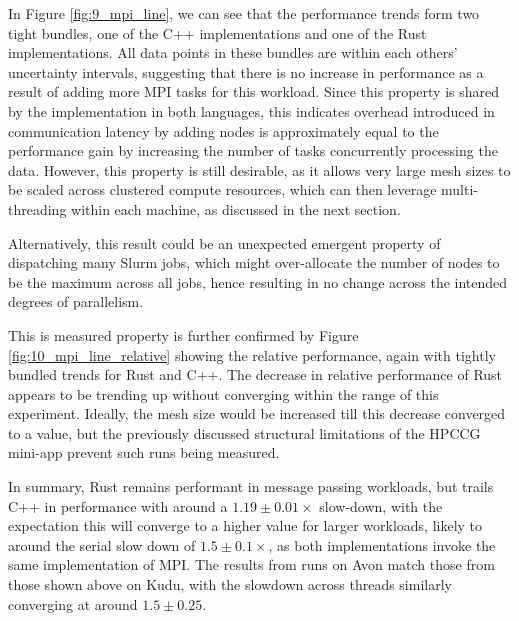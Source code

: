 
In Figure \ref{fig:9_mpi_line}, we can see that the performance trends form two tight bundles, one of the C++ implementations and one of the Rust implementations. All data points in these bundles are within each others' uncertainty intervals, suggesting that there is no increase in performance as a result of adding more MPI tasks for this workload. Since this property is shared by the implementation in both languages, this indicates overhead introduced in communication latency by adding nodes is approximately equal to the performance gain by increasing the number of tasks concurrently processing the data. However, this property is still desirable, as it allows very large mesh sizes to be scaled across clustered compute resources, which can then leverage multi-threading within each machine, as discussed in the next section.

Alternatively, this result could be an unexpected emergent property of dispatching many Slurm jobs, which might over-allocate the number of nodes to be the maximum across all jobs, hence resulting in no change across the intended degrees of parallelism.

This is measured property is further confirmed by Figure \ref{fig:10_mpi_line_relative} showing the relative performance, again with tightly bundled trends for Rust and C++. The decrease in relative performance of Rust appears to be trending up without converging within the range of this experiment. Ideally, the mesh size would be increased till this decrease converged to a value, but the previously discussed structural limitations of the HPCCG mini-app prevent such runs being measured.

In summary, Rust remains performant in message passing workloads, but trails C++ in performance with around a $1.19 \pm 0.01\times$ slow-down, with the expectation this will converge to a higher value for larger workloads, likely to around the serial slow down of $1.5 \pm 0.1\times$, as both implementations invoke the same implementation of MPI. The results from runs on Avon match those from those shown above on Kudu, with the slowdown across threads similarly converging at around $1.5 \pm 0.25$.



